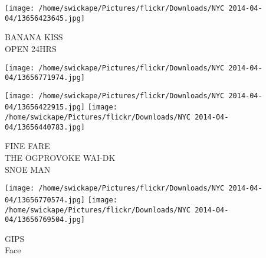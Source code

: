 \documentclass[10pt,letterpaper]{article}
\begin{document}
\vspace{0.25in}
\texttt{[image: /home/swickape/Pictures/flickr/Downloads/NYC 2014-04-04/13656423645.jpg]}

BANANA KISS\\
OPEN 24HRS
\pagebreak

\texttt{[image: /home/swickape/Pictures/flickr/Downloads/NYC 2014-04-04/13656771974.jpg]}

\vspace{0.25in}
\texttt{[image: /home/swickape/Pictures/flickr/Downloads/NYC 2014-04-04/13656422915.jpg]}
\texttt{[image: /home/swickape/Pictures/flickr/Downloads/NYC 2014-04-04/13656440783.jpg]}

FINE FARE\\
THE OGPROVOKE WAI{-}DK\\
SNOE MAN
\pagebreak

\texttt{[image: /home/swickape/Pictures/flickr/Downloads/NYC 2014-04-04/13656770574.jpg]}
\texttt{[image: /home/swickape/Pictures/flickr/Downloads/NYC 2014-04-04/13656769504.jpg]}

GIPS\\
Face
\pagebreak
\end{document}
